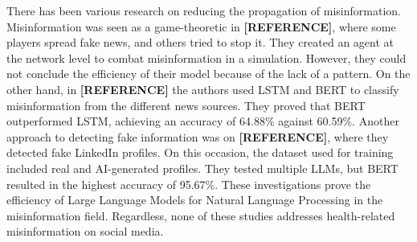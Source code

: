 There has been various research on reducing the propagation of misinformation. Misinformation was seen as a game-theoretic in \textbf{[REFERENCE]}, where some players spread fake news, and others tried
to stop it. They created an agent at the network level to combat misinformation in a simulation. However, they could not conclude the efficiency of their model because of the lack of a pattern. On
the other hand, in \textbf{[REFERENCE]} the authors used LSTM and BERT to classify misinformation from the different news sources. They proved that BERT outperformed LSTM, achieving an accuracy of 64.88\% against 60.59\%. 
Another approach to detecting fake information was on \textbf{[REFERENCE]}, where they detected fake LinkedIn profiles. On this occasion, the dataset used for training included real and AI-generated profiles. They tested multiple
LLMs, but BERT resulted in the highest accuracy of 95.67\%. These investigations prove the efficiency of Large Language Models for Natural Language Processing in the misinformation field. Regardless,
none of these studies addresses health-related misinformation on social media.





